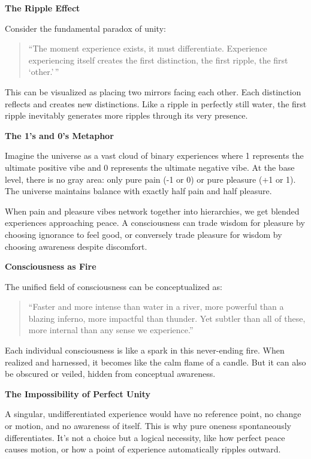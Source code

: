 \textbf{The Ripple Effect}

Consider the fundamental paradox of unity:

\begin{quote}
``The moment experience exists, it must differentiate. Experience experiencing itself creates the first distinction, the first ripple, the first `other.'\,''
\end{quote}

This can be visualized as placing two mirrors facing each other. Each distinction reflects and creates new distinctions. Like a ripple in perfectly still water, the first ripple inevitably generates more ripples through its very presence.

\textbf{The 1's and 0's Metaphor}

Imagine the universe as a vast cloud of binary experiences where 1 represents the ultimate positive vibe and 0 represents the ultimate negative vibe. At the base level, there is no gray area: only pure pain (-1 or 0) or pure pleasure (+1 or 1). The universe maintains balance with exactly half pain and half pleasure.

When pain and pleasure vibes network together into hierarchies, we get blended experiences approaching peace. A consciousness can trade wisdom for pleasure by choosing ignorance to feel good, or conversely trade pleasure for wisdom by choosing awareness despite discomfort.

\textbf{Consciousness as Fire}

The unified field of consciousness can be conceptualized as:

\begin{quote}
``Faster and more intense than water in a river, more powerful than a blazing inferno, more impactful than thunder. Yet subtler than all of these, more internal than any sense we experience.''
\end{quote}

Each individual consciousness is like a spark in this never-ending fire. When realized and harnessed, it becomes like the calm flame of a candle. But it can also be obscured or veiled, hidden from conceptual awareness.

\textbf{The Impossibility of Perfect Unity}

A singular, undifferentiated experience would have no reference point, no change or motion, and no awareness of itself. This is why pure oneness spontaneously differentiates. It's not a choice but a logical necessity, like how perfect peace causes motion, or how a point of experience automatically ripples outward.
